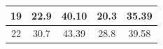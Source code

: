 \documentclass{article}
\begin{document}
\begin{Large}
\begin{table}[h]
\begin{tabular}{|c|cc|cc|}
19                                                                       & \multicolumn{1}{c|}{22.9}                                                    & 40.10                                                       & \multicolumn{1}{c|}{20.3}                                                    & 35.39                                                       \\ \hline
22                                                                       & \multicolumn{1}{c|}{30.7}                                                    & 43.39                                                       & \multicolumn{1}{c|}{28.8}                                                    & 39.58                                                       \\ \hline
\end{tabular}
\end{table}



\end{Large}
\end{document}
